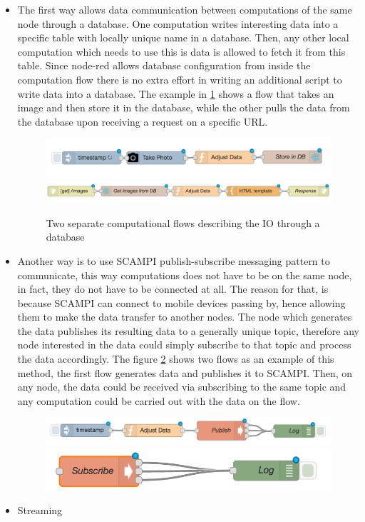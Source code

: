 \begin{itemize}
\item The first way allows data communication between computations of the same node through a database. One computation  writes interesting data into a specific table with locally unique name in a database. Then, any other local computation which needs to use this is data is allowed to fetch it from this table. Since node-red allows database configuration from inside the computation flow there is no extra effort in writing an additional script to write data into a database. The example in \ref{fig:db} shows a flow that takes an image and then store it in the database, while the other pulls the data from the database upon receiving a request on a specific URL. 

\begin{figure}[H]
	\centering
	\includegraphics[scale=0.5]{images/db-out.png}
	\includegraphics[scale=0.5]{images/db-in.png}
	\caption{Two separate computational flows describing the IO through a database }
	\label{fig:db}
\end{figure}

\item Another way is to use SCAMPI publish-subscribe messaging pattern to communicate, this way computations  does not have to be on the same node, in fact, they do not have to be connected at all. The reason for that, is because SCAMPI can connect to mobile devices passing by, hence allowing them to make the data transfer  to another nodes. The node which generates the data publishes its resulting data to a generally unique topic, therefore any node interested in the data could simply subscribe to that topic and process the data accordingly. The figure \ref{fig:scampi} shows two flows as an example of this method, the first flow generates data and publishes it to SCAMPI. Then, on any node, the data could be received via subscribing to the same topic and any computation could be carried out with the data on the flow. 

\begin{figure}[H]
	\centering
	\includegraphics[scale=0.6]{images/SCAMPI-pub.png}
	\includegraphics[scale=0.6]{images/SCAMPI-sub.png}
	\caption{ }
	\label{fig:scampi}
\end{figure}

\item Streaming
\end{itemize}	

